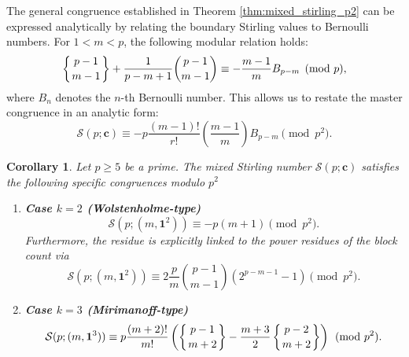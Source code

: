 \documentclass[12pt]{amsart}
\newtheorem{corollary}[theorem]{Corollary}
\theoremstyle{definition}
\begin{document}
The general congruence established in Theorem \ref{thm:mixed_stirling_p2} can be expressed analytically by relating the boundary Stirling values to Bernoulli numbers. For $1 < m < p$, the following modular relation holds:
\begin{equation}
    \left\{ \genfrac{}{}{0pt}{}{p-1}{m-1} \right\} + \frac{1}{p-m+1} \binom{p-1}{m-1} \equiv -\frac{m-1}{m} B_{p-m} \pmod p,
\end{equation}
where $B_n$ denotes the $n$-th Bernoulli number. This allows us to restate the master congruence in an analytic form:
\begin{equation}
    \label{eq:bernoulli_form}
    \mathcal{S}(p; \mathbf{c}) \equiv -p \frac{(m-1)!}{r!} \left( \frac{m-1}{m} \right) B_{p-m} \pmod{p^2}.
\end{equation}

\begin{corollary}
\label{cor:special_residues}
Let $p \ge 5$ be a prime. The mixed Stirling number $\mathcal{S}(p; \mathbf{c})$ satisfies the following specific congruences modulo $p^2$
\begin{enumerate}
    \item \textbf{Case $k=2$ (Wolstenholme-type)} 
    \begin{equation}
        \mathcal{S}(p; (m, \mathbf{1}^2)) \equiv -p(m+1) \pmod{p^2}.
    \end{equation}
    Furthermore, the residue is explicitly linked to the power residues of the block count via
    \begin{equation}
        \mathcal{S}(p; (m, \mathbf{1}^2)) \equiv 2 \frac{p}{m} \binom{p-1}{m-1} (2^{p-m-1} - 1) \pmod{p^2}.
    \end{equation}
    \item \textbf{Case $k=3$ (Mirimanoff-type)} 
    \begin{equation}
        \mathcal{S}(p; (m, \mathbf{1}^3)) \equiv p \frac{(m+2)!}{m!} \left( \left\{ \genfrac{}{}{0pt}{}{p-1}{m+2} \right\} - \frac{m+3}{2} \left\{ \genfrac{}{}{0pt}{}{p-2}{m+2} \right\} \right) \pmod{p^2}.
    \end{equation}
\end{enumerate}
\end{corollary}
\end{document}
